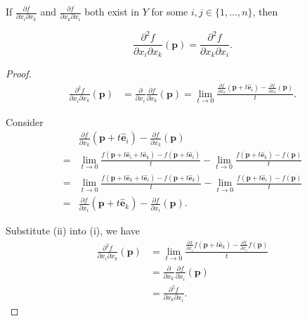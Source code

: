 \documentclass{article}
\begin{document}
\begin{proposition}
	If $\displaystyle \frac{\partial f}{\partial x_i \partial x_k}$ and $\displaystyle \frac{\partial f}{\partial x_k \partial x_i}$ both exist in $Y$ for some $i,j \in \{1, \ldots, n\}$, then	
	
	$$
	\frac{\partial^2 f}{\partial x_i \partial x_k}(\mathbf p) = \frac{\partial^2 f}{\partial x_k \partial x_i}.
	$$
	
	\begin{proof}
		\begin{equation}
			\tag{i}
			\begin{aligned}
				\frac{\partial^2 f}{\partial x_i \partial x_k}(\mathbf p) &= \frac{\partial}{\partial x_i} \frac{\partial f}{\partial x_k} (\mathbf p)
				= \lim_{t \to 0} \frac{\frac{\partial f}{\partial x_k} (\mathbf p + t \mathbf{\hat e}_i) - \frac{\partial f}{\partial x_k} (\mathbf p)}{t}.
			\end{aligned}
		\end{equation}
		
		Consider
		\begin{equation}
			\tag{ii}
			\begin{aligned}
				& \frac{\partial f}{\partial x_k} (\mathbf p + t \mathbf{\hat e}_i) - \frac{\partial f}{\partial x_k} (\mathbf p) \\
				=& \lim_{t \to 0} \frac{f(\mathbf p + t \mathbf{\hat e}_i + t \mathbf{\hat e}_k) - f(\mathbf p + t \mathbf{\hat e}_i)}{t} - \lim_{t \to 0} \frac{f(\mathbf p + t\mathbf{\hat e}_k) - f(\mathbf p)}{t} \\
				=& \lim_{t \to 0} \frac{f(\mathbf p + t \mathbf{\hat e}_k + t \mathbf{\hat e}_i) - f(\mathbf p + t\mathbf{\hat e}_k)}{t} - \lim_{t \to 0} \frac{f(\mathbf p + t\mathbf{\hat e}_i) - f(\mathbf p)}{t} \\
				=& \frac{\partial f}{\partial x_i} (\mathbf p + t\mathbf{\hat e}_k) - \frac{\partial f}{\partial x_i} (\mathbf p).
			\end{aligned}
		\end{equation}
		
		Substitute (ii) into (i), we have
		$$
		\begin{aligned}
			\frac{\partial^2 f}{\partial x_i \partial x_k}(\mathbf p) &= \lim_{t \to 0} \frac{\frac{\partial f}{\partial x_i}f(\mathbf p + t \mathbf{\hat e}_k) - \frac{\partial f}{\partial x_i}f(\mathbf p)}{t} \\
			&= \frac{\partial}{\partial x_k} \frac{\partial f}{\partial x_i} (\mathbf p) \\
			&= \frac{\partial^2 f}{\partial x_k \partial x_i}.
		\end{aligned}
		$$
		
	\end{proof}
\end{proposition}
\end{document}
